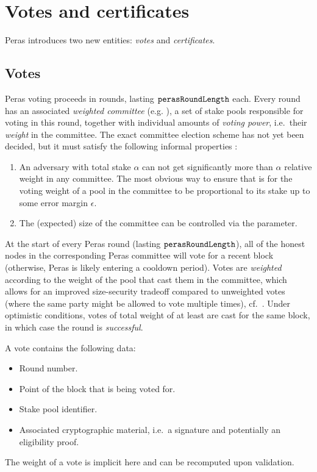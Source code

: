 \section{Votes and certificates}\label{sec:votes certificates generalities}

Peras introduces two new entities: \emph{votes} and \emph{certificates}.

\subsection{Votes}

Peras voting proceeds in rounds, lasting $\mathtt{perasRoundLength}$ each.
Every round has an associated \emph{weighted committee} (e.g. \parencite[Section~4]{gavzi2023fait}), a set of stake pools responsible for voting in this round, together with individual amounts of \emph{voting power}, i.e.\ their \emph{weight} in the committee.
The exact committee election scheme has not yet been decided, but it must satisfy the following informal properties :
\begin{enumerate}
\item
  An adversary with total stake $\alpha$ can not get significantly more than $\alpha$ relative weight in any committee.
  The most obvious way to ensure that is for the voting weight of a pool in the committee to be proportional to its stake up to some error margin $\epsilon$.
\item
  The (expected) size of the committee can be controlled via the \perasN{} parameter.
\end{enumerate}

At the start of every Peras round (lasting $\mathtt{perasRoundLength}$), all of the honest nodes in the corresponding Peras committee will vote for a recent block (otherwise, Peras is likely entering a cooldown period).
Votes are \emph{weighted} according to the weight of the pool that cast them in the committee, which allows for an improved size-security tradeoff compared to unweighted votes (where the same party might be allowed to vote multiple times), cf.~\cite{gavzi2023fait}.
Under optimistic conditions, votes of total weight of at least \perasQuorum{} are cast for the same block, in which case the round is \emph{successful}.

A vote contains the following data:
\begin{itemize}
\item Round number.
\item Point of the block that is being voted for.
\item Stake pool identifier.
\item Associated cryptographic material, i.e.\ a signature and potentially an eligibility proof.
\end{itemize}
The weight of a vote is implicit here and can be recomputed upon validation.

